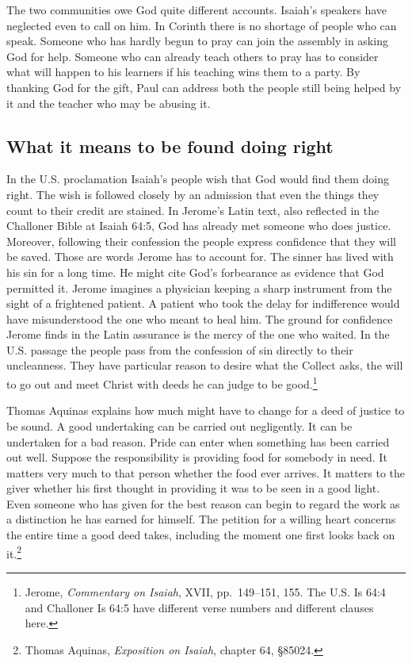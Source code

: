 The two communities owe God quite different accounts. Isaiah's speakers have neglected even to call on him. In Corinth there is no shortage of people who can speak. Someone who has hardly begun to pray can join the assembly in asking God for help. Someone who can already teach others to pray has to consider what will happen to his learners if his teaching wins them to a party. By thanking God for the gift, Paul can address both the people still being helped by it and the teacher who may be abusing it.

\subsection{What it means to be found doing right}

In the U.S. proclamation Isaiah's people wish that God would find them doing right. The wish is followed closely by an admission that even the things they count to their credit are stained. In Jerome's Latin text, also reflected in the Challoner Bible at Isaiah 64:5, God has already met someone who does justice. Moreover, following their confession the people express confidence that they will be saved. Those are words Jerome has to account for. The sinner has lived with his sin for a long time. He might cite God's forbearance as evidence that God permitted it. Jerome imagines a physician keeping a sharp instrument from the sight of a frightened patient. A patient who took the delay for indifference would have misunderstood the one who meant to heal him. The ground for confidence Jerome finds in the Latin assurance is the mercy of the one who waited. In the U.S. passage the people pass from the confession of sin directly to their uncleanness. They have particular reason to desire what the Collect asks, the will to go out and meet Christ with deeds he can judge to be good.\footnote{Jerome, \textit{Commentary on Isaiah}, XVII, pp.~149--151, 155. The U.S. Is 64:4 and Challoner Is 64:5 have different verse numbers and different clauses here.}

Thomas Aquinas explains how much might have to change for a deed of justice to be sound. A good undertaking can be carried out negligently. It can be undertaken for a bad reason. Pride can enter when something has been carried out well. Suppose the responsibility is providing food for somebody in need. It matters very much to that person whether the food ever arrives. It matters to the giver whether his first thought in providing it was to be seen in a good light. Even someone who has given for the best reason can begin to regard the work as a distinction he has earned for himself. The petition for a willing heart concerns the entire time a good deed takes, including the moment one first looks back on it.\footnote{Thomas Aquinas, \textit{Exposition on Isaiah}, chapter 64, §85024.}

